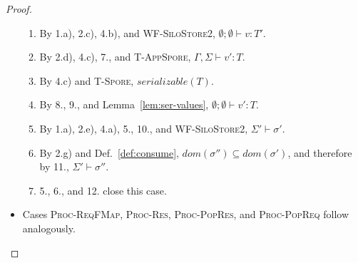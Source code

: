 \documentclass{article}
\theoremstyle{definition}
\begin{document}
\begin{proof}
\begin{itemize}
\begin{enumerate}
\item By 1.a), 2.c), 4.b), and \textsc{WF-SiloStore2}, $\emptyset ; \emptyset \vdash v : T'$.
\item By 2.d), 4.c), 7., and \textsc{T-AppSpore}, $\Gamma, \Sigma \vdash v' : T$.
\item By 4.c) and \textsc{T-Spore}, $serializable(T)$.
\item By 8., 9., and Lemma~\ref{lem:ser-values}, $\emptyset ; \emptyset \vdash v' : T$.
\item By 1.a), 2.e), 4.a), 5., 10., and \textsc{WF-SiloStore2}, $\Sigma' \vdash \sigma'$.
\item By 2.g) and Def.~\ref{def:consume}, $dom(\sigma'') \subseteq dom(\sigma')$, and therefore by 11., $\Sigma' \vdash \sigma''$.
\item 5., 6., and 12. close this case.
\end{enumerate}

\item Cases \textsc{Proc-ReqFMap}, \textsc{Proc-Res}, \textsc{Proc-PopRes}, and \textsc{Proc-PopReq} follow analogously.

\end{itemize}
\end{proof}
\end{document}
